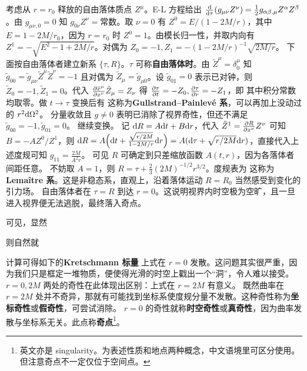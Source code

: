 考虑从 $r=r_0$ 释放的自由落体质点 $Z^\mu$。E-L 方程给出 $\dv{\tau}(g_{\mu\nu} Z^\nu)=\frac 12 g_{\alpha\beta,\mu} Z^\alpha Z^\beta$。由 $g_{\mu\nu,0}=0$ 知 $g_{0\nu} Z^\nu=\text{常数}$。取 $\nu=0$ 有 $Z^0=E/(1-{2M}/{r})$，其中 $E=1-2M/r_0$，因为 $r=r_0$ 时 $Z^0=1$。由模长归一性，并取内向有 $Z^1=-\sqrt{E^2-1+{2M}/{r}}$。对偶为 $Z_0=-1,Z_1=-(1-{2M}/{r})^{-1}{\sqrt{2M/r}}$。
下面按自由落体者建立新系 $\{\tau,R\}$。$\tau$ 可称\textbf{自由落体时}。由 $\tilde Z^\mu=\delta^\mu_0$ 知 $\tilde g_{0 0}=\tilde g_{\mu\nu}\tilde Z^\mu\tilde Z^\nu=-1$ 且对偶为 $\tilde Z_\mu = \tilde g_{\mu0}$。设 $\tilde g_{01} = 0$ 表示已对钟，则 $\tilde Z_0 = -1,\tilde Z_1 = 0$。代入 $\pdv{\tilde x^\mu}{x^\nu}\tilde Z_\mu=Z_\nu$ 得 $\pdv{\tau}{t}=-Z_0,\pdv{\tau}{r}=-Z_1$，即
其中积分常数均取零。做 $t\to\tau$ 变换后有
这称为\textbf{Gullstrand–Painlevé 系}，可以再加上没动过的 $r^2\dd\Omega^2$。
分量收敛且 $g\ne 0$ 表明已消除了视界奇性，但还不满足 $\tilde g_{00}=-1,\tilde g_{01}=0$。
继续变换。
记 $\dd R=A\dd t+B\dd r$，代入 $\tilde Z^1=\pdv{R}{x^\nu}Z^\nu$ 可知 $B=-A Z^0/Z^1$，则
$\dd R=A\Big(\dd t+\frac{\sqrt{r/2M}}{1-{2M}/{r}}\dd r\Big)=A (\dd\tau+\sqrt{r/2M}\dd r)$，直接代入上述度规可知 $g_{11}=\frac{2M}{A^2r}$。
可见 $R$ 可确定到只差缩放函数 $A(t,r)$，因为各落体者间距任意。
不妨取 $A=1$，则 $R=\tau+\frac 23(2M)^{-1/2}r^{3/2}$。度规表为
这称为\textbf{Lemaître 系}。这是非稳态系，直观上，沿着落体运动 $R=R_0$ 当然感受到变化的引力场。
自由落体者在 $\tau=R$ 到达 $r=0$。这说明视界内时空极为空旷，且一旦进入视界便无法逃脱，最终落入奇点。

可见，显然


 则自然就

计算可得如下的\textbf{Kretschmann 标量}
上式在 $r=0$ 发散。这问题其实很严重，因为我们只是框定一堆物质，便使得光滑的时空上戳出一个“洞”，令人难以接受。$r=0,2M$ 两处的奇性在此体现出区别：上式在 $r=2M$ 有意义。
既然曲率在 $r=2M$ 处并不奇异，那就有可能找到坐标系使度规分量不发散。这种奇性称为\textbf{坐标奇性}或\textbf{假奇性}，可尝试消除。
$r=0$ 的奇性就称\textbf{时空奇性}或\textbf{真奇性}，因为曲率发散与坐标系无关。此点称\textbf{奇点}\footnote{英文亦是 singularity。为表述性质和地点两种概念，中文语境里可区分使用。但注意奇点不一定仅位于空间点。}。



